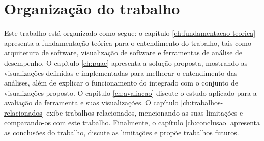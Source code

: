 \section{Organização do trabalho} \label{sec:organizacao-trabalho}

Este trabalho está organizado como segue: o capítulo \ref{ch:fundamentacao-teorica} apresenta a fundamentação teórica para o entendimento do trabalho, tais como arquitetura de software, visualização de software e ferramentas de análise de desempenho. O capítulo \ref{ch:pqae} apresenta a solução proposta, mostrando as visualizações definidas e implementadas para melhorar o entendimento das análises, além de explicar o funcionamento do \textit{\perfMinerName} integrado com o conjunto de visualizações proposto. O capítulo \ref{ch:avaliacao} discute o estudo aplicado para a avaliação da ferramenta e suas visualizações. O capítulo \ref{ch:trabalhos-relacionados} exibe trabalhos relacionados, mencionando as suas limitações e comparando-os com este trabalho. Finalmente, o capítulo \ref{ch:conclusao} apresenta as conclusões do trabalho, discute as limitações e propõe trabalhos futuros.